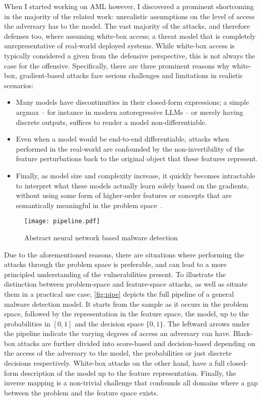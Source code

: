 When I started working on \gls{AML} however, I discovered a prominent shortcoming in the majority of the related work: unrealistic assumptions on the level of access the adversary has to the model.
The vast majority of the attacks, and therefore defenses too, where assuming white-box access; a threat model that is completely unrepresentative of real-world deployed systems.
While white-box access is typically considered a given from the defensive perspective, this is not always the case for the offensive. Specifically, there are three prominent reasons why white-box, gradient-based attacks face serious challenges and limitations in realistic scenarios:

\begin{itemize}
    \item Many models have discontinuities in their closed-form expressions; a simple argmax -- for instance in modern autoregressive LLMs -- or merely having discrete outputs, suffices to render a model non-differentiable.
    \item Even when a model would be end-to-end differentiable, attacks when performed in the real-world are confounded by the non-invertibility of the feature perturbations back to the original object that these features represent.
    \item Finally, as model size and complexity increase, it quickly becomes intractable to interpret what these models actually learn solely based on the gradients, without using some form of higher-order features or concepts that are semantically meaningful in the problem space~\cite{kim2018interpretability}.
\end{itemize}

\begin{figure}
    \centering
    \texttt{[image: pipeline.pdf]}
    \caption{Abstract neural network based malware detection}
    \label{fig:pipe}
\end{figure}

Due to the aforementioned reasons, there are situations where performing the attacks through the problem space is preferable, and can lead to a more principled understanding of the vulnerabilities present.
To illustrate the distinction between problem-space and feature-space attacks, as well as situate them in a practical use case, \autoref{fig:pipe} depicts the full pipeline of a general malware detection model.
It starts from the sample as it occurs in the problem space, followed by the representation in the feature space, the model, up to the probabilities in $[0,1]$ and the decision space $\{0,1\}$.
The leftward arrows under the pipeline indicate the varying degrees of access an adversary can have.
Black-box attacks are further divided into score-based and decision-based depending on the access of the adversary to the model, the probabilities or just discrete decisions respectively.
White-box attacks on the other hand, have a full closed-form description of the model up to the feature representation.
Finally, the inverse mapping is a non-trivial challenge that confounds all domains where a gap between the problem and the feature space exists.

